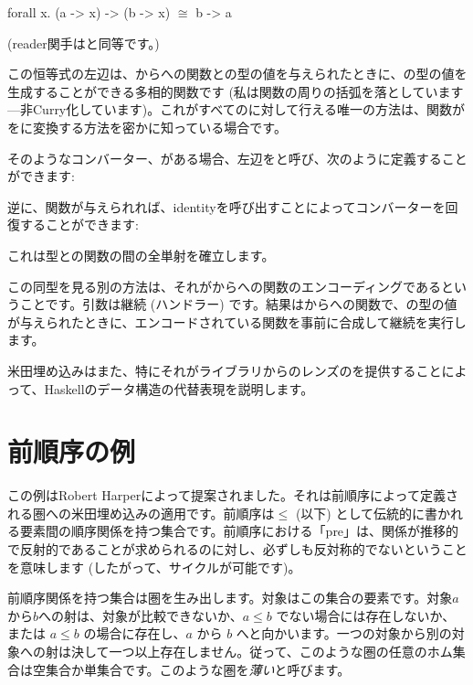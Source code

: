 \begin{snipv}
forall x. (a -> x) -> (b -> x) \ensuremath{\cong} b -> a
\end{snipv}
 (reader関手はと同等です。) 

この恒等式の左辺は、からへの関数との型の値を与えられたときに、の型の値を生成することができる多相的関数です (私は関数の周りの括弧を落としています---非Curry化しています)。これがすべてのに対して行える唯一の方法は、関数がをに変換する方法を密かに知っている場合です。

そのようなコンバーター、がある場合、左辺をと呼び、次のように定義することができます: 

逆に、関数が与えられれば、identityを呼び出すことによってコンバーターを回復することができます: 

これは型との関数の間の全単射を確立します。

この同型を見る別の方法は、それがからへの関数のエンコーディングであるということです。引数は継続 (ハンドラー) です。結果はからへの関数で、の型の値が与えられたときに、エンコードされている関数を事前に合成して継続を実行します。

米田埋め込みはまた、特にそれがライブラリからのレンズのを提供することによって、Haskellのデータ構造の代替表現を説明します。

\section{前順序の例}

この例はRobert Harperによって提案されました。それは前順序によって定義される圏への米田埋め込みの適用です。前順序は$\leqslant$ (以下) として伝統的に書かれる要素間の順序関係を持つ集合です。前順序における「pre」は、関係が推移的で反射的であることが求められるのに対し、必ずしも反対称的でないということを意味します (したがって、サイクルが可能です)。

前順序関係を持つ集合は圏を生み出します。対象はこの集合の要素です。対象$a$から$b$への射は、対象が比較できないか、$a \leqslant b$ でない場合には存在しないか、または $a \leqslant b$ の場合に存在し、$a$ から $b$ へと向かいます。一つの対象から別の対象への射は決して一つ以上存在しません。従って、このような圏の任意のホム集合は空集合か単集合です。このような圏を\emph{薄い}と呼びます。

